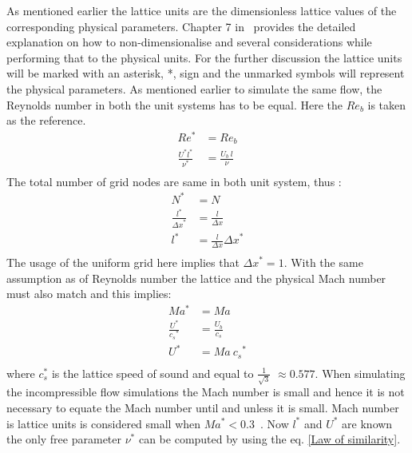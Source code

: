 As mentioned earlier the lattice units are the dimensionless lattice values of the corresponding physical parameters. Chapter 7 in~\cite{krueger:book} provides the detailed explanation on how to non-dimensionalise and several considerations while performing that to the physical units. For the further discussion the lattice units will be marked with an asterisk, *, sign and the unmarked symbols will represent the physical parameters. As mentioned earlier to simulate the same flow, the Reynolds number in both the unit systems has to be equal. Here the $Re_b$ is taken as the reference.
%
\begin{equation}
\label{Law of similarity}
\begin{split}
Re^* &= Re_b\\
\frac{ U^*l^*}{\nu^*}  &= \frac{U_b\ l}{\nu}\\
\end{split}
\end{equation}
%
The total number of grid nodes are same in both unit system, thus :
\begin{equation}
\label{Length lb}
\begin{split}
N^* &= N\\
\frac{l^*}{{\Delta x}^*}  &= \frac{l}{{\Delta x}}\\
l^*  &= \frac{l}{{\Delta x}} {\Delta x}^*\\
\end{split}
\end{equation}
The usage of the uniform grid here implies that ${\Delta x}^* = 1$. With the same assumption as of Reynolds number the lattice and the physical Mach number must also match and this implies:
\begin{equation}
\label{Length lb}
\begin{split}
Ma^* &= Ma\\
\frac{U^*}{{c_s}^*}  &= \frac{U_b}{{c_s}}\\
U^*  &= Ma\ {{c_s}^*}\\
\end{split}
\end{equation}
%
where $c_s^*$ is the lattice speed of sound and equal to $\frac{1}{\sqrt{3}}$ $\approx 0.577$. When simulating the incompressible flow simulations the Mach number is small and hence it is not necessary to equate the Mach number until and unless it is small. Mach number is lattice units is considered small when $Ma^*<0.3$~\cite{krueger:book}.
Now $l^*$ and $U^*$ are known the only free parameter $\nu^*$ can be computed by using the eq. \ref{Law of similarity}.

